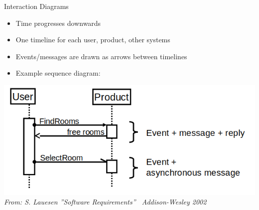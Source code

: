 \begin{Slide}{Interaction Diagrams}

\begin{itemize}
\item Time progresses downwards 
\item One timeline for each user, product, other systems
\item Events/messages are drawn as arrows between timelines
\item Example sequence diagram:
\end{itemize}
\hfill\begin{minipage}[t]{0.8\textwidth}
\vspace{0.4em}\includegraphics[width=1.0\textwidth]{../img/uml-sequence-diagram}
{\vspace*{1em}\fontsize{5}{5}\itshape\selectfont From: S. Lauesen ''Software Requirements'' \textcopyright~Addison-Wesley 2002}
\end{minipage}

\end{Slide}
